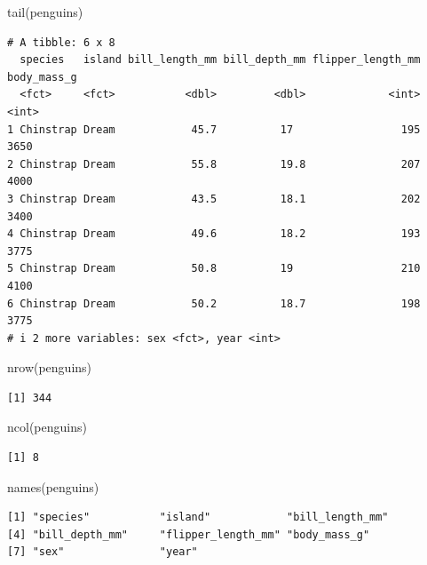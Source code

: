 \documentclass[
  letterpaper,
  DIV=11,
  numbers=noendperiod]{scrreprt}
\newenvironment{Shaded}{\begin{snugshade}}{\end{snugshade}}
\newcommand{\FunctionTok}[1]{\textcolor[rgb]{0.28,0.35,0.67}{#1}}
\newcommand{\NormalTok}[1]{\textcolor[rgb]{0.00,0.23,0.31}{#1}}
\begin{document}
\begin{Shaded}
\begin{Highlighting}[]
\FunctionTok{tail}\NormalTok{(penguins)}
\end{Highlighting}
\end{Shaded}

\begin{verbatim}
# A tibble: 6 x 8
  species   island bill_length_mm bill_depth_mm flipper_length_mm body_mass_g
  <fct>     <fct>           <dbl>         <dbl>             <int>       <int>
1 Chinstrap Dream            45.7          17                 195        3650
2 Chinstrap Dream            55.8          19.8               207        4000
3 Chinstrap Dream            43.5          18.1               202        3400
4 Chinstrap Dream            49.6          18.2               193        3775
5 Chinstrap Dream            50.8          19                 210        4100
6 Chinstrap Dream            50.2          18.7               198        3775
# i 2 more variables: sex <fct>, year <int>
\end{verbatim}

\begin{Shaded}
\begin{Highlighting}[]
\FunctionTok{nrow}\NormalTok{(penguins)}
\end{Highlighting}
\end{Shaded}

\begin{verbatim}
[1] 344
\end{verbatim}

\begin{Shaded}
\begin{Highlighting}[]
\FunctionTok{ncol}\NormalTok{(penguins)}
\end{Highlighting}
\end{Shaded}

\begin{verbatim}
[1] 8
\end{verbatim}

\begin{Shaded}
\begin{Highlighting}[]
\FunctionTok{names}\NormalTok{(penguins)}
\end{Highlighting}
\end{Shaded}

\begin{verbatim}
[1] "species"           "island"            "bill_length_mm"   
[4] "bill_depth_mm"     "flipper_length_mm" "body_mass_g"      
[7] "sex"               "year"             
\end{verbatim}
\end{document}
